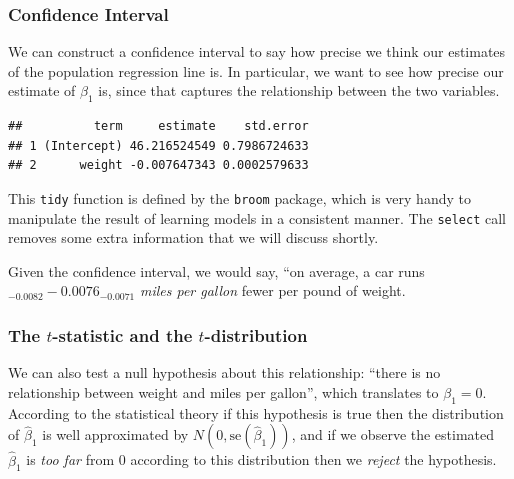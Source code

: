\documentclass[]{article}
\newenvironment{Shaded}{\begin{snugshade}}{\end{snugshade}}
\newcommand{\KeywordTok}[1]{\textcolor[rgb]{0.13,0.29,0.53}{\textbf{{#1}}}}
\newcommand{\StringTok}[1]{\textcolor[rgb]{0.31,0.60,0.02}{{#1}}}
\newcommand{\NormalTok}[1]{{#1}}
\theoremstyle{definition}
\theoremstyle{definition}
\theoremstyle{remark}
\begin{document}
\subsubsection{Confidence Interval}\label{confidence-interval}

We can construct a confidence interval to say how precise we think our
estimates of the population regression line is. In particular, we want
to see how precise our estimate of \(\beta_1\) is, since that captures
the relationship between the two variables.

\begin{Shaded}
\end{Shaded}

\begin{verbatim}
##          term     estimate    std.error
## 1 (Intercept) 46.216524549 0.7986724633
## 2      weight -0.007647343 0.0002579633
\end{verbatim}

This \texttt{tidy} function is defined by the \texttt{broom} package,
which is very handy to manipulate the result of learning models in a
consistent manner. The \texttt{select} call removes some extra
information that we will discuss shortly.

Given the confidence interval, we would say, ``on average, a car runs
\(_{-0.0082} -0.0076_{-0.0071}\) \emph{miles per gallon} fewer per pound
of weight.

\subsubsection{\texorpdfstring{The \(t\)-statistic and the
\(t\)-distribution}{The t-statistic and the t-distribution}}\label{the-t-statistic-and-the-t-distribution}

We can also test a null hypothesis about this relationship: ``there is
no relationship between weight and miles per gallon'', which translates
to \(\beta_1=0\). According to the statistical theory if this hypothesis
is true then the distribution of \(\hat{\beta}_1\) is well approximated
by \(N(0,\mathrm{se}(\hat{\beta}_1))\), and if we observe the estimated
\(\hat{\beta}_1\) is \emph{too far} from 0 according to this
distribution then we \emph{reject} the hypothesis.
\end{document}
